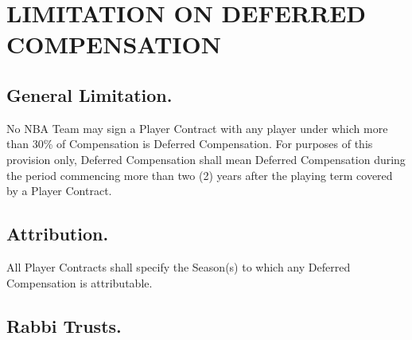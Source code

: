 \documentclass[
]{book}
\begin{document}
\hypertarget{limitation-on-deferred-compensation}{%
\chapter{LIMITATION ON DEFERRED COMPENSATION}\label{limitation-on-deferred-compensation}}

\hypertarget{general-limitation.-1}{%
\section{General Limitation.}\label{general-limitation.-1}}

No NBA Team may sign a Player Contract with any player under which more than 30\% of Compensation is Deferred Compensation. For purposes of this provision only, Deferred Compensation shall mean Deferred Compensation during the period commencing more than two (2) years after the playing term covered by a Player Contract.

\hypertarget{attribution.}{%
\section{Attribution.}\label{attribution.}}

All Player Contracts shall specify the Season(s) to which any Deferred Compensation is attributable.

\hypertarget{rabbi-trusts.}{%
\section{Rabbi Trusts.}\label{rabbi-trusts.}}
\end{document}
